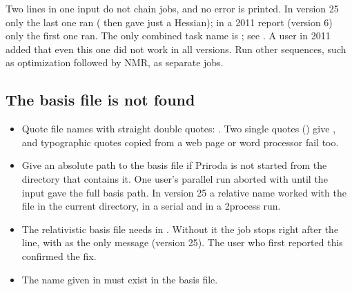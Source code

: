 \documentclass[letterpaper,10pt,english,openany,oneside]{sphinxmanual}
\begin{document}
\sphinxAtStartPar
Two  lines in one input do not chain jobs, and no error is printed. In version 25 only the last one ran
( then  gave just a Hessian); in a 2011 report (version 6) only the first one ran. The only combined task name is ; see {\hyperref[\detokenize{reference/control:control-task}]{}}. A user in 2011
added that even this one did not work in all versions. Run other sequences, such as optimization followed by NMR, as
separate jobs.




\subsection{The basis file is not found}
\label{\detokenize{troubleshooting/common-problems:the-basis-file-is-not-found}}\begin{itemize}
\item {} 
\sphinxAtStartPar
Quote file names with straight double quotes: . Two single quotes () give
, and typographic quotes copied from a web page or word processor fail too.



\item {} 
\sphinxAtStartPar
Give an absolute path to the basis file if Priroda is not started from the directory that contains it. One user’s
parallel run aborted with  until the input gave the full basis path. In version 25 a relative
name worked with the file in the current directory, in a serial and in a 2\sphinxhyphen{}process run.



\item {} 
\sphinxAtStartPar
The relativistic basis file  needs {\hyperref[\detokenize{reference/control:control-four}]{}} in {\hyperref[\detokenize{reference/control:group-control}]{}}.
Without it the job stops right after the  line, with  as the only message (version 25).
The user who first reported this confirmed the fix.



\item {} 
\sphinxAtStartPar
The name given in {\hyperref[\detokenize{reference/molecule:molecule-set}]{}} must exist in the basis file.



\end{itemize}
\end{document}
